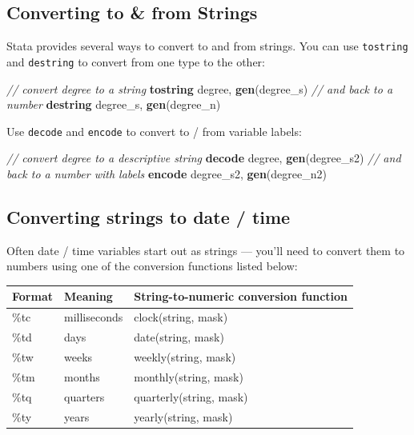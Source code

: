 \documentclass[
]{book}
\newenvironment{Shaded}{\begin{snugshade}}{\end{snugshade}}
\newcommand{\CommentTok}[1]{\textcolor[rgb]{0.56,0.35,0.01}{\textit{#1}}}
\newcommand{\KeywordTok}[1]{\textcolor[rgb]{0.13,0.29,0.53}{\textbf{#1}}}
\newcommand{\NormalTok}[1]{#1}
\begin{document}
\hypertarget{converting-to-from-strings}{%
\subsection{Converting to \& from Strings}\label{converting-to-from-strings}}

Stata provides several ways to convert to and from strings. You can use \texttt{tostring} and \texttt{destring} to convert from one type to the other:

\begin{Shaded}
\begin{Highlighting}[]
\CommentTok{// convert degree to a string}
\KeywordTok{tostring}\NormalTok{ degree, }\KeywordTok{gen}\NormalTok{(degree\_s)}
\CommentTok{// and back to a number}
\KeywordTok{destring}\NormalTok{ degree\_s, }\KeywordTok{gen}\NormalTok{(degree\_n)}
\end{Highlighting}
\end{Shaded}

Use \texttt{decode} and \texttt{encode} to convert to / from variable labels:

\begin{Shaded}
\begin{Highlighting}[]
\CommentTok{// convert degree to a descriptive string}
\KeywordTok{decode}\NormalTok{ degree, }\KeywordTok{gen}\NormalTok{(degree\_s2)}
\CommentTok{// and back to a number with labels}
\KeywordTok{encode}\NormalTok{ degree\_s2, }\KeywordTok{gen}\NormalTok{(degree\_n2)}
\end{Highlighting}
\end{Shaded}

\hypertarget{converting-strings-to-date-time}{%
\subsection{Converting strings to date / time}\label{converting-strings-to-date-time}}

Often date / time variables start out as strings --- you'll need to convert them to numbers using one of the conversion functions listed below:

\begin{longtable}[]{@{}lll@{}}
\toprule
Format & Meaning & String-to-numeric conversion function\tabularnewline
\midrule
\endhead
\%tc & milliseconds & clock(string, mask)\tabularnewline
\%td & days & date(string, mask)\tabularnewline
\%tw & weeks & weekly(string, mask)\tabularnewline
\%tm & months & monthly(string, mask)\tabularnewline
\%tq & quarters & quarterly(string, mask)\tabularnewline
\%ty & years & yearly(string, mask)\tabularnewline
\bottomrule
\end{longtable}
\end{document}
